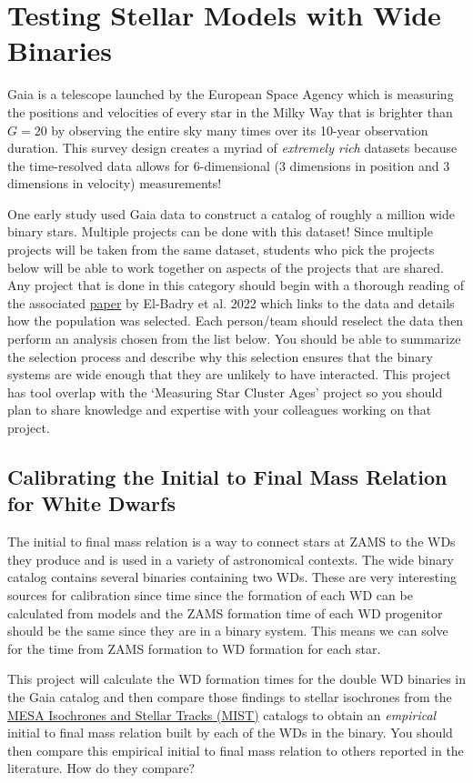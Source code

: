 \documentclass[10pt]{extarticle}
\begin{document}
\section{Testing Stellar Models with Wide Binaries}
Gaia is a telescope launched by the European Space Agency which is measuring the
positions and velocities of every star in the Milky Way that is brighter than
$G=20$ by observing the entire sky many times over its 10-year observation
duration. This survey design creates a myriad of \emph{extremely rich} datasets
because the time-resolved data allows for 6-dimensional (3 dimensions in
position and 3 dimensions in velocity) measurements!

One early study used Gaia data to construct a catalog of roughly a million wide
binary stars. Multiple projects can be done with this dataset! Since multiple
projects will be taken from the same dataset, students who pick the projects
below will be able to work together on aspects of the projects that are shared.
Any project that is done in this category should begin with a thorough reading
of the associated
\href{https://ui.adsabs.harvard.edu/abs/2021MNRAS.506.2269E/abstract}{paper} by
El-Badry et al. 2022 which links to the data and details how the population was
selected. Each person/team should reselect the data then perform an analysis
chosen from the list below. You should be able to summarize the selection
process and describe why this selection ensures that the binary systems are wide
enough that they are unlikely to have interacted. This project has tool overlap
with the `Measuring Star Cluster Ages' project so you should plan to share
knowledge and expertise with your colleagues working on that project. 

\subsection{Calibrating the Initial to Final Mass Relation for White Dwarfs}
 The initial to final mass relation is a way to connect stars at ZAMS to the WDs
 they produce and is used in a variety of astronomical contexts. The wide binary
 catalog contains several binaries containing two WDs. These are very
 interesting sources for calibration since time since the formation of each WD
 can be calculated from models and the ZAMS formation time of each WD progenitor
 should be the same since they are in a binary system. This means we can solve
 for the time from ZAMS formation to WD formation for each star.
 
 This project will calculate the WD formation times for the double WD binaries
 in the Gaia catalog and then compare those findings to stellar isochrones from
 the \href{https://waps.cfa.harvard.edu/MIST/}{MESA Isochrones and Stellar
 Tracks (MIST)} catalogs to obtain an \emph{empirical} initial to final mass
 relation built by each of the WDs in the binary. You should then compare this
 empirical initial to final mass relation to others reported in the literature.
 How do they compare?
\end{document}

